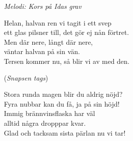 {\footnotesize\textit{Melodi: Kors på Idas grav}}\par
\vspace{10pt}
Helan, halvan ren vi tagit i ett svep\\
ett glas pilsner till, det gör ej nån förtret.\\
Men där nere, långt där nere,\\
väntar halvan på sin vän.\\
Tersen kommer nu, så blir vi av med den.\par
\vspace{10pt}
(\textit{Snapsen tags})\par
\vspace{10pt}
Stora runda magen blir du aldrig nöjd?\\
Fyra nubbar kan du få, ja på sin höjd!\\
Immig brännvinsflaska har väl\\
alltid några dropppar kvar.\\
Glad och tacksam sista pärlan nu vi tar!